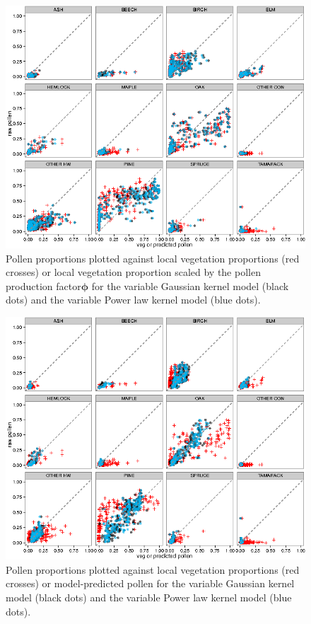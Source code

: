 \begin{figure}
\centering
\includegraphics[width=7in]{figures/pollen_phi_scaled_flexible.png}
\caption{Pollen proportions plotted against local vegetation
  proportions (red crosses) or local vegetation proportion scaled by
  the pollen production factor$\bm{\phi}$ for the variable Gaussian
  kernel model (black dots) and the variable Power law kernel model
  (blue dots).}
\label{fig:focal_scaled}
\end{figure}

\begin{figure}
\centering
\includegraphics[width=7in]{figures/pollen_preds_flexible.png}
\caption{Pollen proportions plotted against local vegetation
  proportions (red crosses) or model-predicted pollen for the variable
  Gaussian kernel model (black dots) and the variable Power law kernel
  model (blue dots).}
\label{fig:preds}
\end{figure}

